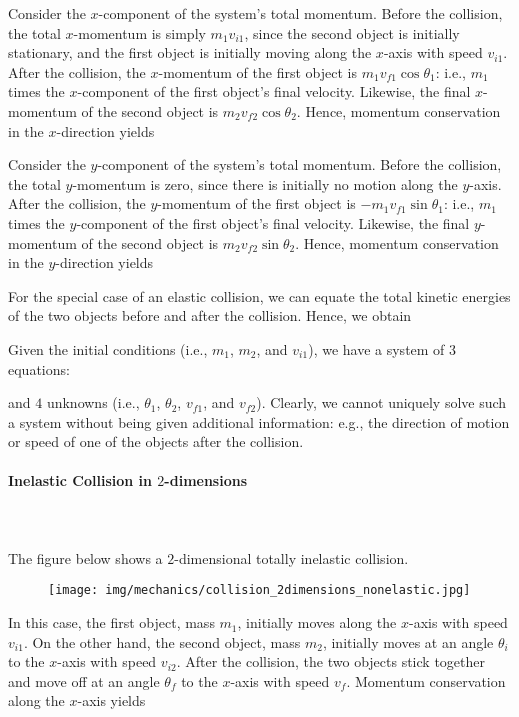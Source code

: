 	Consider the $x$-component of the system's total momentum. Before the collision, the total $x$-momentum is simply $m_1 v_{i1}$, since the second object is initially stationary, and the first object is initially moving along the $x$-axis with speed $v_{i1}$. After the collision, the $x$-momentum of the first object is  $m_1 v_{f1} \cos\theta_1$: i.e., $m_1$ times the $x$-component of the first object's final velocity. Likewise, the final $x$-momentum of the second object is  $m_2 v_{f2} \cos\theta_2$. Hence, momentum conservation in the $x$-direction yields 
	
	
	Consider the $y$-component of the system's total momentum. Before the collision, the total $y$-momentum is zero, since there is initially no motion along the $y$-axis. After the collision, the $y$-momentum of the first object is  $-m_1 v_{f1} \sin\theta_1$: i.e., $m_1$ times the $y$-component of the first object's final velocity. Likewise, the final $y$-momentum of the second object is  $m_2 v_{f2} \sin\theta_2$. Hence, momentum conservation in the $y$-direction yields 
	
	
	For the special case of an elastic collision, we can equate the total kinetic energies of the two objects before and after the collision. Hence, we obtain 
	
	
	Given the initial conditions (i.e., $m_1$, $m_2$, and $v_{i1}$), we have a system of $3$ equations:
	
	
	 and $4$ unknowns (i.e., $\theta_1$, $\theta_2$, $v_{f1}$, and $v_{f2}$). Clearly, we cannot uniquely solve such a system without being given additional information: e.g., the direction of motion or speed of one of the objects after the collision.
	
	
	\paragraph{Inelastic Collision in $2$-dimensions}\mbox{}\\\\
	
	The figure below shows a $2$-dimensional totally inelastic collision. 
	\begin{figure}[H]
		\centering
		\texttt{[image: img/mechanics/collision\_2dimensions\_nonelastic.jpg]}
	\end{figure}
	In this case, the first object, mass $m_1$, initially moves along the $x$-axis with speed $v_{i1}$. On the other hand, the second object, mass $m_2$, initially moves at an angle $\theta_i$ to the $x$-axis with speed $v_{i2}$. After the collision, the two objects stick together and move off at an angle $\theta_f$ to the $x$-axis with speed $v_f$. Momentum conservation along the $x$-axis yields 
	
